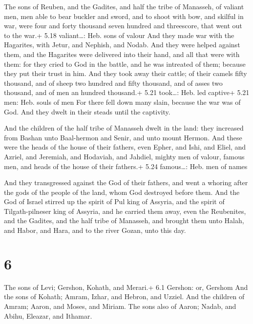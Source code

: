  The sons of Reuben, and the Gadites, and half the tribe
of Manasseh, of valiant men, men able to bear buckler and sword, and to
shoot with bow, and skilful in war, were four and forty thousand seven
hundred and threescore, that went out to the war.+ 5.18 valiant\ldots:
Heb. sons of valour  And they made war with the Hagarites,
with Jetur, and Nephish, and Nodab.  And they were helped
against them, and the Hagarites were delivered into their hand, and all
that were with them: for they cried to God in the battle, and he was
intreated of them; because they put their trust in him. 
And they took away their cattle; of their camels fifty thousand, and of
sheep two hundred and fifty thousand, and of asses two thousand, and of
men an hundred thousand.+ 5.21 took\ldots: Heb. led captive+ 5.21 men:
Heb. souls of men  For there fell down many slain, because
the war was of God. And they dwelt in their steads until the captivity.

 And the children of the half tribe of Manasseh dwelt in
the land: they increased from Bashan unto Baal-hermon and Senir, and
unto mount Hermon.  And these were the heads of the house
of their fathers, even Epher, and Ishi, and Eliel, and Azriel, and
Jeremiah, and Hodaviah, and Jahdiel, mighty men of valour, famous men,
and heads of the house of their fathers.+ 5.24 famous\ldots: Heb. men of
names

 And they transgressed against the God of their fathers,
and went a whoring after the gods of the people of the land, whom God
destroyed before them.  And the God of Israel stirred up
the spirit of Pul king of Assyria, and the spirit of Tilgath-pilneser
king of Assyria, and he carried them away, even the Reubenites, and the
Gadites, and the half tribe of Manasseh, and brought them unto Halah,
and Habor, and Hara, and to the river Gozan, unto this day.

\hypertarget{section-5}{%
\section{6}\label{section-5}}

 The sons of Levi; Gershon, Kohath, and Merari.+ 6.1
Gershon: or, Gershom  And the sons of Kohath; Amram, Izhar,
and Hebron, and Uzziel.  And the children of Amram; Aaron,
and Moses, and Miriam. The sons also of Aaron; Nadab, and Abihu,
Eleazar, and Ithamar.

